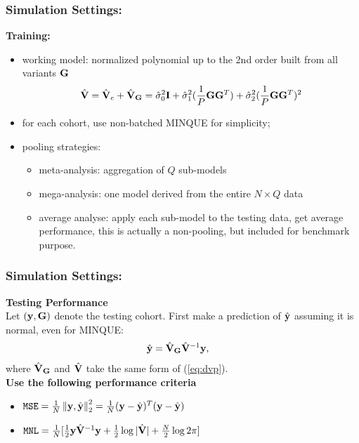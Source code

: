 \documentclass{beamer}
\begin{document}
\begin{frame}
  \frametitle{Simulation Settings:} %
  \textbf{Training:}
  \begin{itemize}
  \item working model: normalized polynomial up to the 2nd order built
    from all variants $\mathbf{G}$
    \begin{align}\label{eq:dvp}
      \hat{\mathbf{V}} = \hat{\mathbf{V}}_e + \hat{\mathbf{V}}_\mathbf{G} = \hat{\sigma}^2_0\textbf{I} +
      \hat{\sigma}_1^2 (\frac{1}{P}{\mathbf{G} \mathbf{G}^T}) + \hat{\sigma}_2^2
      (\frac{1}{P}{\mathbf{G} \mathbf{G}^T})^2
    \end{align}
  \item for each cohort, use non-batched MINQUE for simplicity;
  \item pooling strategies:
    \begin{itemize}
    \item meta-analysis: aggregation of $Q$ sub-models
    \item mega-analysis: one model derived from the entire
      $N \times Q$ data
    \item average analyse: apply each sub-model to the testing data,
      get average performance, this is actually a non-pooling, but
      included for benchmark purpose.
    \end{itemize}
  \end{itemize}
\end{frame}
\begin{frame}
  \frametitle{Simulation Settings:} %
  \textbf{Testing Performance} \\
  Let $(\mathbf{y}, \mathbf{G})$ denote the testing cohort. First make a prediction
  of $\hat{\mathbf{y}}$ assuming it is normal, even for MINQUE:
  \begin{align}
    \begin{split}
      \hat{\mathbf{y}} &= \hat{\mathbf{V}}_\mathbf{G} \hat{\mathbf{V}}^{-1} \mathbf{y},
    \end{split}
  \end{align}
  where $\hat{\mathbf{V}}_\mathbf{G}$ and $\hat{\mathbf{V}}$ take the same form of (\ref{eq:dvp}).\\
  \textbf{Use the following performance criteria}
  \begin{itemize}
  \item
    $\mathtt{MSE} = \frac{1}{N} \left\lVert\mathbf{y}, \hat{\mathbf{y}}\right\rVert_2^2 =
    \frac{1}{N} (\mathbf{y}-\hat{\mathbf{y}})^T(\mathbf{y}-\hat{\mathbf{y}})$
  \item
    $\mathtt{MNL} = \frac{1}{N} [\frac{1}{2}\mathbf{y}\hat{\mathbf{V}}^{-1}\mathbf{y} +
    \frac{1}{2}\log{|\hat{\mathbf{V}}|} + \frac{N}{2}\log{2\pi}]$
  \end{itemize}
\end{frame}
\end{document}
